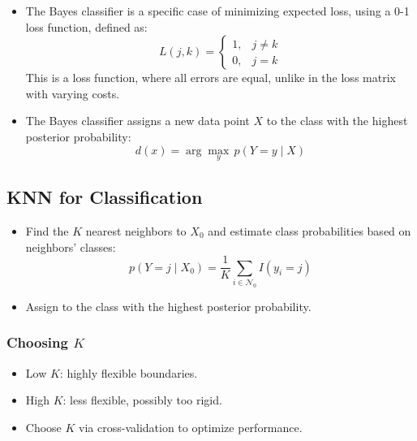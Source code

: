 \documentclass{article}
\begin{document}
\begin{itemize}
  \item The Bayes classifier is a specific case of minimizing expected loss, using a 0-1 loss function, defined as:
  \[
  L(j, k) = \begin{cases} 1, & j \neq k \\ 0, & j = k \end{cases}
  \]
  This is a loss function, where all errors are equal, unlike in the loss matrix with varying costs.
  
  \item The Bayes classifier assigns a new data point $X$ to the class with the highest posterior probability:
  \[
  d(x) = \arg\max_y \, p(Y = y \mid X)
  \]
\end{itemize}

\subsection{KNN for Classification}

\begin{itemize}
  \item Find the $K$ nearest neighbors to $X_0$ and estimate class probabilities based on neighbors' classes:
  \[
  p(Y = j \mid X_0) = \frac{1}{K} \sum_{i \in \mathcal{N}_0} I(y_i = j)
  \]
  \item Assign to the class with the highest posterior probability.
\end{itemize}

\subsubsection{Choosing $K$}

\begin{itemize}
  \item Low $K$: highly flexible boundaries.
  \item High $K$: less flexible, possibly too rigid.
  \item Choose $K$ via cross-validation to optimize performance.
\end{itemize}
\end{document}
